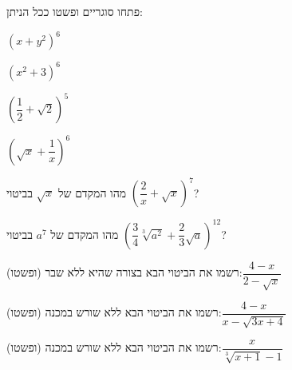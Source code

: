 \documentclass{infi-ex}
\begin{document}
\makeextitle


\begin{question}
פתחו סוגריים ופשטו ככל הניתן:
\begin{parts}
  \item $(x+y^2)^6$
  \item $(x^2+3)^6$
  \item $\left(\dfrac12+\sqrt2\right)^5$
  \item $\left(\sqrt x+\dfrac1x\right)^6$
\end{parts}
\end{question}

\begin{question}
מהו המקדם של $\sqrt x$ בביטוי $\left(\dfrac2x+\sqrt x\right)^7$?
\end{question}

\begin{question}
מהו המקדם של $a^7$ בביטוי $\left(\dfrac34\sqrt[3]{a^2}+\dfrac23\sqrt a\right)^{12}$?
\end{question}


\begin{question}
רשמו את הביטוי הבא בצורה שהיא ללא שבר (ופשטו):\quad $\dfrac{4-x}{2-\sqrt x}$
\end{question}

\begin{question}
רשמו את הביטוי הבא ללא שורש במכנה (ופשטו):\quad $\dfrac{4-x}{x-\sqrt{3x+4}}$
\end{question}

\begin{question}
רשמו את הביטוי הבא ללא שורש במכנה (ופשטו):\quad $\dfrac{x}{\sqrt[3]{x+1}-1}$
\end{question}
\end{document}
